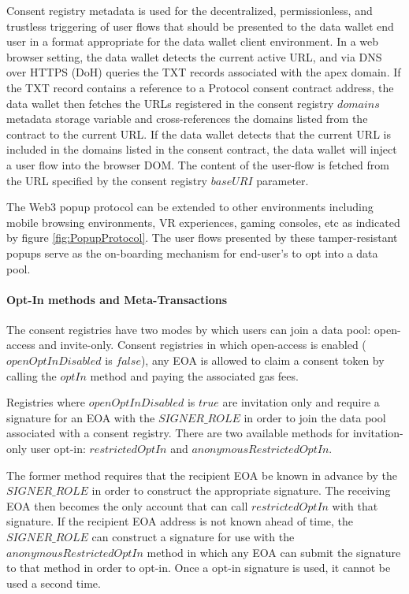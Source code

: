Consent registry metadata is used for the decentralized, permissionless, and trustless triggering of user flows that should be presented to the data wallet 
end user in a format appropriate for the data wallet client environment. In a web browser setting, the data wallet detects the current active URL, and via DNS 
over HTTPS (DoH) queries the TXT records associated with the apex domain. If the TXT record contains a reference to a Protocol consent 
contract address, the data wallet then fetches the URLs registered in the consent registry $domains$ metadata storage variable and cross-references the domains 
listed from the contract to the current URL. If the data wallet detects that the current URL is included in the domains listed in the 
consent contract, the data wallet will inject a user flow into the browser DOM. The content of the user-flow is fetched from the URL specified by the consent 
registry $baseURI$ parameter. 

The Web3 popup protocol can be extended to other environments including mobile browsing environments, VR experiences, gaming consoles, etc as indicated by 
figure \ref{fig:PopupProtocol}. The user flows presented by these tamper-resistant popups serve as the on-boarding mechanism for end-user's to opt into a data pool.

\paragraph{Opt-In methods and Meta-Transactions}
\label{section:OptInMethods}

The consent registries have two modes by which users can join a data pool: open-access and invite-only. Consent registries in which open-access is 
enabled ($openOptInDisabled$ is $false$), any EOA is allowed to claim a consent token by calling the $optIn$ method and paying the associated gas
fees. 

Registries where $openOptInDisabled$ is $true$ are invitation only and require a signature for an EOA with the $SIGNER\_ROLE$ in order to join 
the data pool associated with a consent registry. There are two available methods for invitation-only user opt-in: $restrictedOptIn$ and $anonymousRestrictedOptIn$. 

The former method
requires that the recipient EOA be known in advance by the $SIGNER\_ROLE$ in order to construct the appropriate signature. The receiving EOA then 
becomes the only account that can call $restrictedOptIn$ with that signature. If the recipient EOA address is not known ahead of time, the $SIGNER\_ROLE$
can construct a signature for use with the $anonymousRestrictedOptIn$ method in which any EOA can submit the signature to that method in order to opt-in. Once a opt-in signature is used, it cannot be used a second time. 

